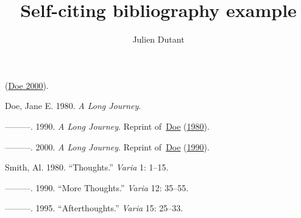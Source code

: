 \documentclass[
]{article}
\title{Self-citing bibliography example}
\author{Julien Dutant}
\date{}
\newlength{\cslhangindent}
\newlength{\cslentryspacingunit} %
\newenvironment{CSLReferences}[2] %
 {%
  \setlength{\parindent}{0pt}
  \ifodd #1
  \let\oldpar\par
  \def\par{\hangindent=\cslhangindent\oldpar}
  \fi
  \setlength{\parskip}{#2\cslentryspacingunit}
 }%
 {}
\begin{document}
\maketitle

(\protect\hyperlink{ref-Doe2000}{Doe 2000}).

\hypertarget{refs}{}
\begin{CSLReferences}{1}{0}
\leavevmode{}%
Doe, Jane E. 1980. \emph{A Long Journey}.

\leavevmode{}%
---------. 1990. \emph{A Long Journey}. Reprint
of~\protect\hyperlink{ref-Doe1980}{Doe}
(\protect\hyperlink{ref-Doe1980}{1980}).

\leavevmode{}%
---------. 2000. \emph{A Long Journey}. Reprint
of~\protect\hyperlink{ref-Doe1990}{Doe}
(\protect\hyperlink{ref-Doe1990}{1990}).

\leavevmode{}%
Smith, Al. 1980. {``Thoughts.''} \emph{Varia} 1: 1--15.

\leavevmode{}%
---------. 1990. {``More Thoughts.''} \emph{Varia} 12: 35--55.

\leavevmode{}%
---------. 1995. {``Afterthoughts.''} \emph{Varia} 15: 25--33.

\end{CSLReferences}
\end{document}
